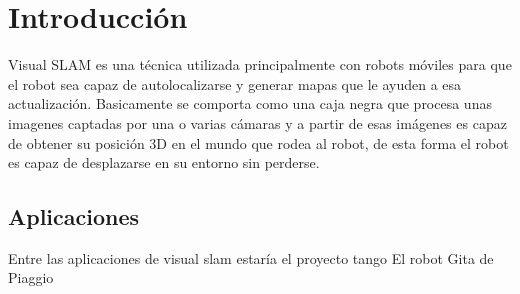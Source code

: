 \chapter{Introducción} \label{cap:introduccion}
\setcounter{page}{1}

Visual SLAM es una técnica utilizada principalmente con robots móviles para que el robot sea capaz de autolocalizarse y generar mapas que le ayuden a esa actualización.
Basicamente se comporta como una caja negra que procesa unas imagenes captadas por una o varias cámaras y a partir de esas imágenes es capaz de obtener su posición 3D en el mundo que rodea al robot, de esta forma el robot es capaz de desplazarse en su entorno sin perderse.


\clearpage
\section{Aplicaciones}

Entre las aplicaciones de visual slam estaría el 
proyecto tango
El robot Gita de Piaggio